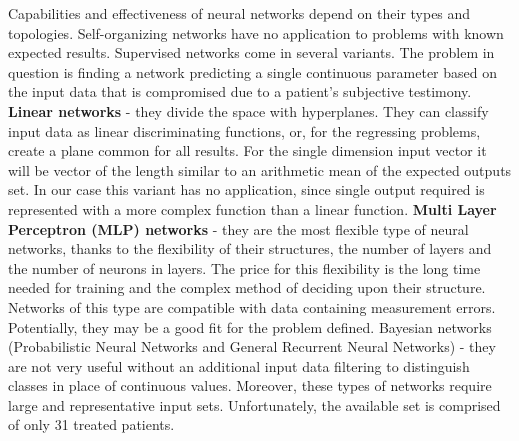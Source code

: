 \documentclass[10pt,oneside]{memoir}
\begin{document}
Capabilities and effectiveness of neural networks depend on their types and topologies. Self-organizing networks have no application to problems with known expected results. Supervised networks come in several variants. The problem in question is finding a network predicting a single continuous parameter based on the input data that is compromised due to a patient's subjective testimony.
\textbf{Linear networks} - they divide the space with hyperplanes. They can classify input data as linear discriminating functions, or, for the regressing problems, create a plane common for all results. For the single dimension input vector it will be vector of the length similar to an arithmetic mean of the expected outputs set. In our case this variant has no application, since single output required is represented with a more complex function than a linear function.
\textbf{Multi Layer Perceptron (MLP) networks} - they are the most flexible type of neural networks, thanks to the flexibility of their structures, the number of layers and the number of neurons in layers. The price for this flexibility is the long time needed for training and the complex method of deciding upon their structure. Networks of this type are compatible with data containing measurement errors. Potentially, they may be a good fit for the problem defined.
Bayesian networks (Probabilistic Neural Networks and General Recurrent Neural Networks) - they are not very useful without an additional input data filtering to distinguish classes in place of continuous values. Moreover, these types of networks require large and representative input sets. Unfortunately, the available set is comprised of only 31 treated patients.
\end{document}
